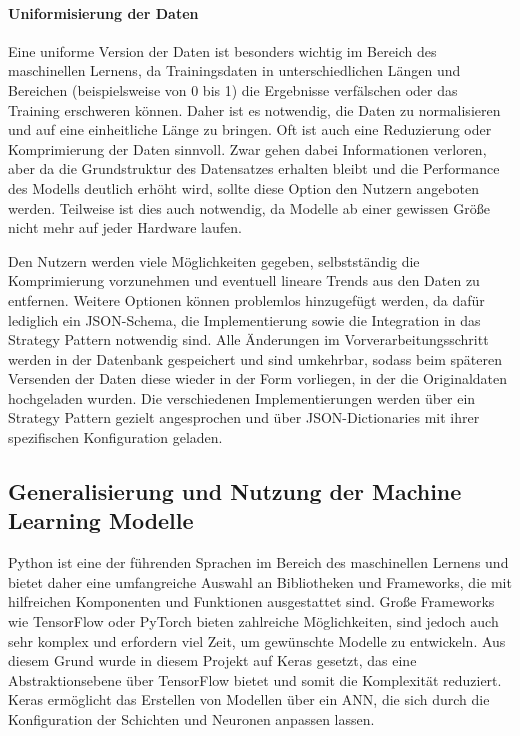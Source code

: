 \paragraph{Uniformisierung der Daten}
Eine uniforme Version der Daten ist besonders wichtig im Bereich des maschinellen Lernens, da Trainingsdaten in unterschiedlichen Längen und Bereichen (beispielsweise von 0 bis 1) die Ergebnisse verfälschen oder das Training erschweren können. Daher ist es notwendig, die Daten zu normalisieren und auf eine einheitliche Länge zu bringen. 
Oft ist auch eine Reduzierung oder Komprimierung der Daten sinnvoll. Zwar gehen dabei Informationen verloren, aber da die Grundstruktur des Datensatzes erhalten bleibt und die Performance des Modells 
deutlich erhöht wird, sollte diese Option den Nutzern angeboten werden. Teilweise ist dies auch notwendig, da Modelle ab einer gewissen Größe nicht mehr auf jeder Hardware laufen.

Den Nutzern werden viele Möglichkeiten gegeben, selbstständig die Komprimierung vorzunehmen und eventuell lineare Trends aus den Daten zu entfernen. Weitere Optionen können problemlos hinzugefügt werden, da dafür lediglich ein JSON-Schema, die Implementierung sowie die Integration in das Strategy Pattern notwendig sind. Alle Änderungen im Vorverarbeitungsschritt werden in der Datenbank gespeichert und sind umkehrbar, sodass beim späteren Versenden der Daten diese wieder in der Form vorliegen, in der die Originaldaten hochgeladen wurden. Die verschiedenen Implementierungen werden über ein Strategy Pattern gezielt angesprochen und über JSON-Dictionaries mit ihrer spezifischen Konfiguration geladen.



\subsection{Generalisierung und Nutzung der Machine Learning Modelle}
\label{sec:djangoML}
Python ist eine der führenden Sprachen im Bereich des maschinellen Lernens und bietet daher eine umfangreiche Auswahl an Bibliotheken und Frameworks, die mit hilfreichen Komponenten und Funktionen ausgestattet sind. 
Große Frameworks wie TensorFlow oder PyTorch bieten zahlreiche Möglichkeiten, sind jedoch auch sehr komplex und erfordern viel Zeit, um gewünschte Modelle zu entwickeln. Aus diesem Grund wurde in diesem Projekt auf Keras gesetzt, 
das eine Abstraktionsebene über TensorFlow bietet und somit die Komplexität reduziert. Keras ermöglicht das Erstellen von Modellen über ein \ac{ANN}, die sich durch die Konfiguration der Schichten und Neuronen anpassen lassen.

